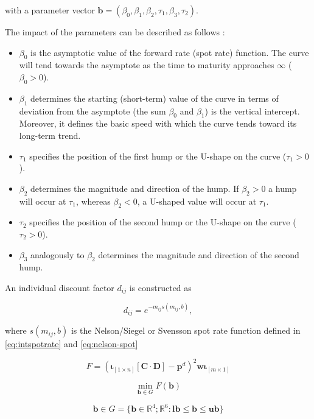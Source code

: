 with a parameter vector ${\bm{b}} = \left(\beta_0,\beta_1,\beta_2,\tau_1,\beta_3,\tau_2\right)$.

The impact of the parameters can be described as follows \citep[see][p.7]{Bolder1999}:

\begin{itemize}
\item $\beta_0$ is the asymptotic value of the forward rate (spot rate) function.  The curve will tend towards the asymptote as the time to maturity approaches  $\infty$ ($\beta_0 >0$).
\item $\beta_1$ determines the starting (short-term) value of the curve in terms of deviation from the asymptote (the sum $\beta_0$ and $\beta_1$) is the vertical intercept. Moreover, it defines the basic speed with which the curve tends toward its long-term trend.
\item $\tau_1$ specifies the position of the first hump or the U-shape on the curve ($\tau_1>0$).
\item $\beta_2$ determines the magnitude and direction of the hump. If $\beta_2 >0$  a hump will occur at  $\tau_1$, whereas $\beta_2<0$, a U-shaped value will occur at $\tau_1$.
\item $\tau_2$ specifies the position of the second hump or the U-shape on the curve ($\tau_2>0$).
\item $\beta_3$ analogously  to  $\beta_2$ determines the magnitude and direction of the second hump.
\end{itemize}


 An individual discount factor $d_{ij}$ is constructed as

\begin{displaymath}
d_{ij}=e^{-m_{ij}s(m_{ij},b)},
\end{displaymath}

where $s(m_{ij},b)$ is the Nelson/Siegel or Svensson spot rate function defined in \eqref{eq:intspotrate} and \eqref{eq:nelson-spot}


\begin{equation}\label{eq:objfct-nelson}
	F=\left( \bm{\iota}_{\left[1 \times n\right]}\left[\bm{C}\cdot\bm{D}\right] - 		\bm{p}^d\right)^2 \bm{w}\bm{\iota}_{\left[m \times 1\right]}
\end{equation}

\begin{equation}
  \label{eq:objfct-nelsonmin}
  \min_{\bm{b} \in G} F(\bm{b})
\end{equation}

	
	 $$ \bm{b} \in G =   \{ \bm{b} \in \mathbb{R}^4 ; \mathbb{R}^6 : \mathbf{lb} \leq \bm{b} \leq \mathbf{ub}  \}$$



